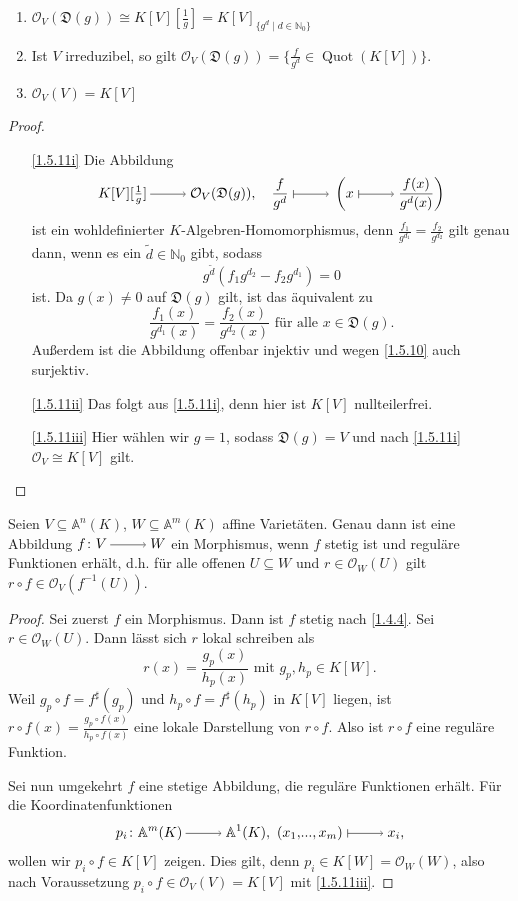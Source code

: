 \documentclass[a4paper,12pt,index=toc]{scrbook}
\theoremstyle{keinenummern} %
\def\A{\mathbb{A}}
\def\O{\mathcal{O}}
\newcommand{\D}{\mathfrak{D}}
\newcommand{\Quot}{\operatorname{Quot}}
\renewcommand{\dotsc}{\ensuremath{\!...}}
\newcommand{\schlange}[1]{\widetilde{#1}}
\newcommand{\set}[1]{\ensuremath{\mathbb{#1}}}
\newcommand{\N}{\set{N}}
\begin{document}
\begin{kor}\label{1.5.11}
  \begin{enumerate}
  \item{} $\O_V(\D(g))\cong K[V][\frac1g] = K[V]_{\{g^d\mid d\in\N_0\}}$
  \item{} Ist $V$ irreduzibel, so gilt $\O_V(\D(g))=\{\frac{f}{g^d}\in\Quot(K[V])\}$.
  \item{} $\O_V(V)=K[V]$
  \end{enumerate}
\end{kor}
\begin{proof}
  \begin{enumerate}
  \item[\ref{1.5.11i}] Die Abbildung
    \[K[V][\textstyle\frac1g]\ra\O_V(\D(g)),\quad \displaystyle\frac{f}{g^d}\mapsto\left(x\mapsto\frac{f(x)}{g^d(x)}\right) \]
    ist ein wohldefinierter $K$-Algebren-Homomorphismus, denn $\frac{f_1}{g^{d_1}}=\frac{f_2}{g^{d_2}}$ gilt genau dann, wenn es
    ein $\schlange{d}\in\N_0$ gibt, sodass \[g^{\schlange{d}}(f_1g^{d_2}-f_2g^{d_1})=0\] ist. Da $g(x)\neq0$ auf $\D(g)$ gilt, ist das
    äquivalent zu \[\frac{f_1(x)}{g^{d_1}(x)}=\frac{f_2(x)}{g^{d_2}(x)}\text{ für alle }x\in \D(g).\] Außerdem ist die Abbildung
    offenbar injektiv und wegen \cref{1.5.10} auch surjektiv.
  \item[\ref{1.5.11ii}] Das folgt aus \ref{1.5.11i}, denn hier ist $K[V]$ nullteilerfrei.
  \item[\ref{1.5.11iii}] Hier wählen wir $g=1$, sodass $\D(g)=V$ und nach \ref{1.5.11i} $\O_V\cong K[V]$ gilt.
  \end{enumerate}
\end{proof}

\begin{prop}\label{1.5.12}
  Seien $V\subseteq\A^n(K)$, $W\subseteq\A^m(K)$ affine Varietäten. Genau dann ist eine Abbildung $f\colon V\ra W$ ein
  Morphismus, wenn $f$ stetig ist und reguläre Funktionen erhält, d.h. für alle offenen $U\subseteq W$ und $r\in\O_W(U)$ gilt
  $r\circ f\in\O_V(f^{-1}(U))$.
\end{prop}
\begin{proof}
  Sei zuerst $f$ ein Morphismus. Dann ist $f$ stetig nach \cref{1.4.4}. Sei $r\in\O_W(U)$. Dann lässt sich $r$ lokal
  schreiben als \[r(x)=\frac{g_p(x)}{h_p(x)}\text{ mit }g_p,h_p\in K[W].\] Weil $g_p\circ f=f^\sharp(g_p)$ und $h_p\circ
  f=f^\sharp(h_p)$ in $K[V]$ liegen, ist $r\circ f(x)=\frac{g_p\circ f(x)}{h_p\circ f(x)}$ eine lokale Darstellung von
  $r\circ f$. Also ist $r\circ f$ eine reguläre Funktion.

  Sei nun umgekehrt $f$ eine stetige Abbildung, die reguläre Funktionen erhält. Für die Koordinatenfunktionen \[p_i\colon
  \A^m(K)\ra \A^1(K),\ (x_1,\dotsc,x_m)\mapsto x_i,\] wollen wir $p_i\circ f\in K[V]$ zeigen. Dies gilt, denn $p_i\in K[W] =
  \O_W(W)$, also nach Voraussetzung $p_i\circ f\in\O_V(V)=K[V]$ mit \cref{1.5.11iii}.
\end{proof}
\end{document}
